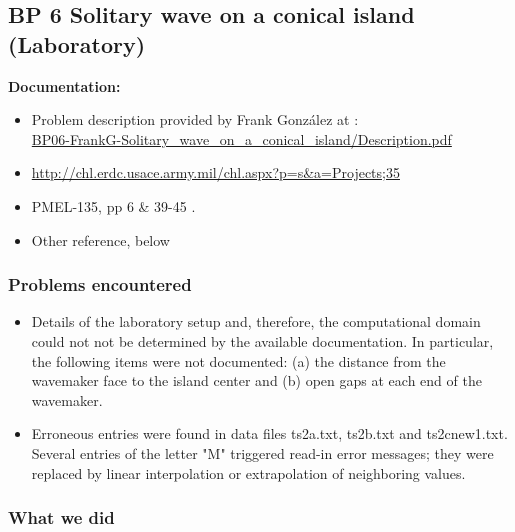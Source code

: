 \subsection{BP 6
  Solitary wave on a conical island (Laboratory)}

{\bf Documentation:}
\begin {itemize}

\item Problem description provided by Frank Gonz\'alez 
 at \cite{bp-description}:\\
\href{https://github.com/rjleveque/nthmp-benchmark-problems/blob/master/BP06-FrankG-Solitary_wave_on_a_conical_island/Description.pdf}
{BP06-FrankG-Solitary\_wave\_on\_a\_conical\_island/Description.pdf} 
\item \url{http://chl.erdc.usace.army.mil/chl.aspx?p=s&a=Projects;35}
\item PMEL-135, pp 6 \& 39-45 \cite{SynolakisBernard:pmel135}.
\item Other reference, below
\end{itemize} 

\subsubsection {Problems encountered}

\begin {itemize}
\item Details of the laboratory setup and, therefore, the computational domain could not not be determined by the available documentation.  In particular, the following items were not documented: (a) the distance from the wavemaker face to the island center and (b) open gaps at each end of the wavemaker.
\item Erroneous entries were found in data files ts2a.txt, ts2b.txt and ts2cnew1.txt.  Several entries of the letter "M" triggered read-in error messages; they were replaced by linear interpolation or extrapolation of neighboring values.
\end{itemize} 

\subsubsection{What we did}

